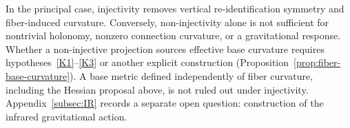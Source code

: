     In the principal case, injectivity removes vertical re-identification symmetry and fiber-induced curvature.
    Conversely, non-injectivity alone is not sufficient for nontrivial holonomy, nonzero connection curvature,
    or a gravitational response.
    Whether a non-injective projection sources effective base curvature requires hypotheses~\ref{K1}--\ref{K3}
    or another explicit construction (Proposition~\ref{prop:fiber-base-curvature}).
    A base metric defined independently of fiber curvature, including the Hessian proposal above, is not
    ruled out under injectivity.
    Appendix~\ref{subsec:IR} records a separate open question: construction of the infrared gravitational action.
